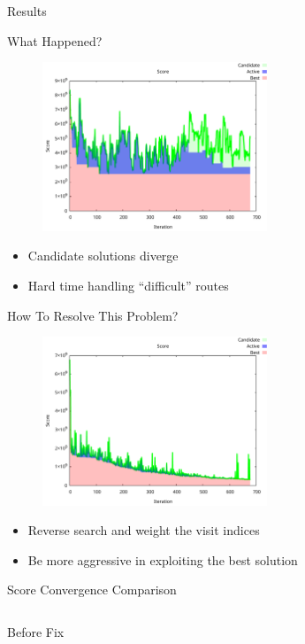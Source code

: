 \documentclass[aspectratio=169]{beamer}
\begin{document}
\begin{frame}[label={sec:org4ee59dd}]{Results}
\begin{frame}[label={sec:org1ea1eb2}]{What Happened?}
\begin{figure}[htpb]
\centering
    \includegraphics[width=0.6\textwidth]{img/score-diverge}
\end{figure}

\begin{itemize}
\item Candidate solutions diverge
\item Hard time handling ``difficult'' routes
\end{itemize}
\end{frame}
\begin{frame}[label={sec:orgf5abf08}]{How To Resolve This Problem?}
\begin{figure}[htpb]
\centering
    \includegraphics[width=0.6\textwidth]{img/score-convergence}
\end{figure}

\begin{itemize}
\item Reverse search and weight the visit indices
\item Be more aggressive in exploiting the best solution
\end{itemize}
\end{frame}

\begin{frame}[label={sec:org1702709}]{Score Convergence Comparison}
\begin{columns}
\begin{column}{0.5\columnwidth}
\begin{center}
Before Fix
\end{center}


\end{column}
\end{columns}
\end{frame}
\end{frame}
\end{document}
